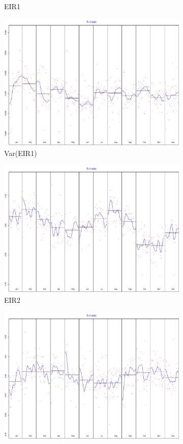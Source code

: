 \documentclass[12pt,a4paper,oneside]{book}
\begin{document}
\begin{figure}
\begin{subfigure}{.5\textwidth}
  \caption{EIR1}
\end{subfigure}
\begin{subfigure}{.5\textwidth}
  \centering
  \includegraphics[width=.8\linewidth]{Graphs/S-I_4.pdf}
  \caption{Var(EIR1)}
\end{subfigure}
\begin{subfigure}{.5\textwidth}
  \centering
  \includegraphics[width=.8\linewidth]{Graphs/S-I_5.pdf}
  \caption{EIR2}
\end{subfigure}
\begin{subfigure}{.5\textwidth}
  \centering
  \includegraphics[width=.8\linewidth]{Graphs/S-I_6.pdf}

\end{subfigure}
\end{figure}
\end{document}
